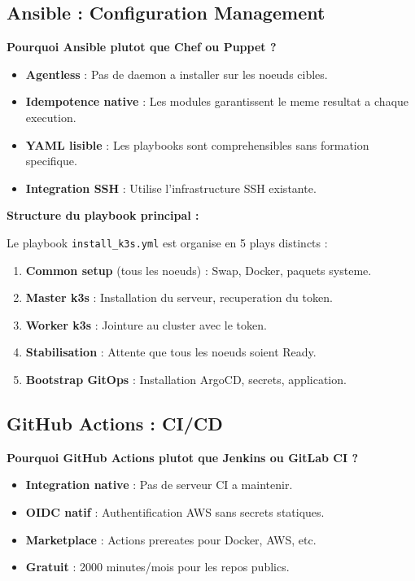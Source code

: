 \documentclass[12pt,a4paper,french]{report}
\begin{document}
\subsection{Ansible : Configuration Management}

\textbf{Pourquoi Ansible plutot que Chef ou Puppet ?}

\begin{itemize}
    \item \textbf{Agentless} : Pas de daemon a installer sur les noeuds cibles.
    \item \textbf{Idempotence native} : Les modules garantissent le meme resultat a chaque execution.
    \item \textbf{YAML lisible} : Les playbooks sont comprehensibles sans formation specifique.
    \item \textbf{Integration SSH} : Utilise l'infrastructure SSH existante.
\end{itemize}

\textbf{Structure du playbook principal :}

Le playbook \texttt{install\_k3s.yml} est organise en 5 plays distincts :

\begin{enumerate}
    \item \textbf{Common setup} (tous les noeuds) : Swap, Docker, paquets systeme.
    \item \textbf{Master k3s} : Installation du serveur, recuperation du token.
    \item \textbf{Worker k3s} : Jointure au cluster avec le token.
    \item \textbf{Stabilisation} : Attente que tous les noeuds soient Ready.
    \item \textbf{Bootstrap GitOps} : Installation ArgoCD, secrets, application.
\end{enumerate}

\subsection{GitHub Actions : CI/CD}

\textbf{Pourquoi GitHub Actions plutot que Jenkins ou GitLab CI ?}

\begin{itemize}
    \item \textbf{Integration native} : Pas de serveur CI a maintenir.
    \item \textbf{OIDC natif} : Authentification AWS sans secrets statiques.
    \item \textbf{Marketplace} : Actions prereates pour Docker, AWS, etc.
    \item \textbf{Gratuit} : 2000 minutes/mois pour les repos publics.
\end{itemize}
\end{document}
